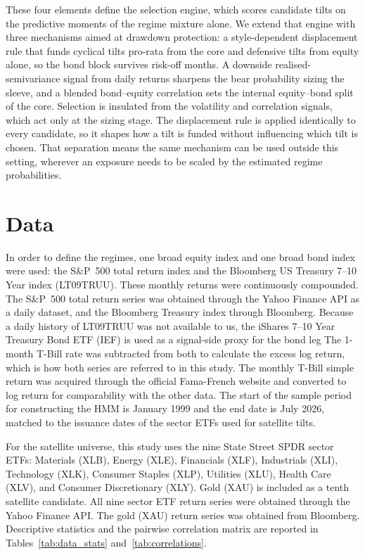 \documentclass[11pt, a4paper]{article}
\newcommand{\new}[1]{#1}
\begin{document}
\new{These four elements define the selection engine, which scores candidate tilts on the
predictive moments of the regime mixture alone. We extend that engine with three mechanisms
aimed at drawdown protection: a style-dependent displacement
rule that funds cyclical tilts pro-rata from the core and defensive tilts from equity alone, so
the bond block survives risk-off months. A downside realised-semivariance signal from daily
returns sharpens the bear probability sizing the sleeve, and a blended bond--equity correlation
sets the internal equity--bond split of the core. Selection is insulated from the volatility and correlation signals, which act only at
the sizing stage. The displacement rule is applied identically to every candidate, so it shapes
how a tilt is funded without influencing which tilt is chosen. That separation means the same
mechanism can be used outside this setting, wherever an exposure needs to be scaled by the
estimated regime probabilities.}

\section{Data}
\label{sec:data}

In order to define the regimes, one broad equity index and one broad bond index were used:
the S\&P~500 total return index and the Bloomberg US Treasury 7--10 Year index (LT09TRUU).
These monthly returns were continuously compounded. The S\&P~500 total return series was
obtained through the Yahoo Finance API as a daily dataset, and the Bloomberg Treasury index 
through Bloomberg. Because a daily history of LT09TRUU was not available to us, 
the iShares 7--10 Year Treasury Bond ETF (IEF) is used as a signal-side proxy for the bond leg
The 1-month T-Bill rate was subtracted from both to calculate the excess log return, which is
how both series are referred to in this study. The monthly T-Bill simple return was acquired
through the official Fama-French website and converted to log return for comparability with
the other data. The start of the sample period for constructing the HMM is January 1999 and
the end date is July 2026, matched to the issuance dates of the sector ETFs used for
satellite tilts.

For the satellite universe, this study uses the nine State Street SPDR sector ETFs: Materials
(XLB), Energy (XLE), Financials (XLF), Industrials (XLI), Technology (XLK), Consumer
Staples (XLP), Utilities (XLU), Health Care (XLV), and Consumer Discretionary (XLY). Gold
(XAU) is included as a tenth satellite candidate. All nine sector ETF return series were obtained through the Yahoo Finance API. The gold (XAU) return series was obtained from Bloomberg. Descriptive statistics and the pairwise correlation matrix are reported in Tables~\ref{tab:data_stats} and~\ref{tab:correlations}.
\end{document}
